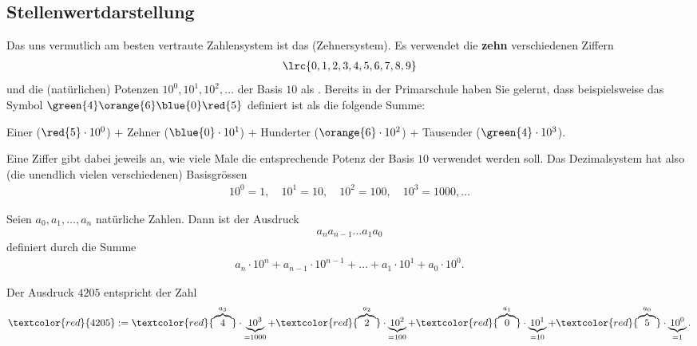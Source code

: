 \subsection{Stellenwertdarstellung}
Das uns vermutlich am besten vertraute Zahlensystem ist das 
(Zehnersystem). Es verwendet die \textbf{zehn} verschiedenen Ziffern
\begin{align*}
  \lrc{0,1,2,3,4,5,6,7,8,9}
\end{align*}
und die (natürlichen) Potenzen $10^0, 10^1, 10^2, \ldots$ der Basis $10$ als .
Bereits in der Primarschule haben Sie gelernt, dass beispielsweise das Symbol $\green{4}\orange{6}\blue{0}\red{5}$ definiert ist als die folgende
Summe:
\begin{center}
   Einer ($\red{5}\cdot 10^0$) $+$  Zehner ($\blue{0}\cdot 10^1$) $+$  Hunderter
  ($\orange{6}\cdot 10^2$) +  Tausender
  ($\green{4}\cdot 10^3$). 
\end{center}
Eine Ziffer gibt dabei jeweils an, wie viele Male die entsprechende Potenz der Basis $10$ verwendet werden soll. Das
Dezimalsystem hat also (die unendlich vielen verschiedenen) Basisgrössen
\begin{align*}
  10^0=1,\quad 10^1=10,\quad 10^2=100,\quad 10^3=1000,\ldots
\end{align*}

\begin{mydefinition}\label{mydefinition:Stellenwertdarstellung}
  Seien $a_0, a_1, \ldots, a_n$ natürliche Zahlen. Dann ist der Ausdruck
  \begin{align*}
    a_na_{n-1}\ldots a_1a_0
  \end{align*}
  definiert durch die Summe
  \begin{align*}
    a_n\cdot 10^n + a_{n-1}\cdot 10^{n-1}+\ldots + a_1\cdot 10^1 + a_0\cdot 10^0.
  \end{align*}
\end{mydefinition}

\begin{myexample}
  Der Ausdruck $4205$ entspricht der Zahl
  \begin{align*}
    \textcolor{red}{4205} := \textcolor{red}{\overbrace{4}^{a_3}}\cdot \underbrace{10^3}_{=1000} + \textcolor{red}{\overbrace{2}^{a_2}}\cdot \underbrace{10^2}_{=100} + \textcolor{red}{\overbrace{0}^{a_1}}\cdot \underbrace{10^1}_{=10} + \textcolor{red}{\overbrace{5}^{a_0}}\cdot \underbrace{10^0}_{=1}.
\end{align*}
\end{myexample}

